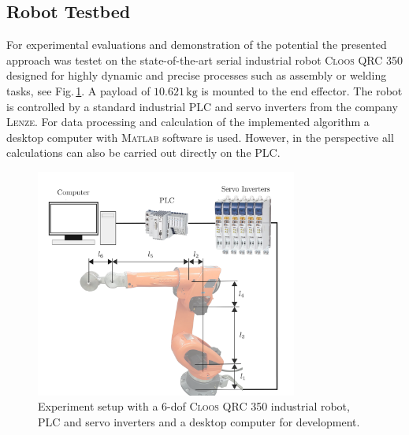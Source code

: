 
\subsection{Robot Testbed}
\label{subsec:RobotTestbed}
For experimental evaluations and demonstration of the potential the presented approach was testet on the state-of-the-art serial industrial  robot \textsc{Cloos QRC 350} designed for highly dynamic and precise processes such as assembly or welding tasks, see Fig.\,\ref{fig:testbench}. 
A payload of $10.621\,\mathrm{kg}$ is mounted to the end effector.
The robot is controlled by a standard industrial PLC and servo inverters from the company \textsc{Lenze}. 
For data processing and calculation of the implemented algorithm a desktop computer with \textsc{Matlab} software is used. 
However, in the perspective all calculations can also be carried out directly on the PLC. 

\begin{figure}[!ht]             %
    \centering                  %
    \def\svgwidth{\textwidth/2}    
    \includegraphics[width=8.6cm]{Chapters/Experiments/Robot_Testbed/Cloos_cover} 
    \vspace{-0.2cm}
    \caption{Experiment setup with a 6-dof \textsc{Cloos QRC 350} industrial robot, PLC and servo inverters and a desktop computer for development.}
    \vspace{-0.2cm}
   \label{fig:testbench}
\end{figure}


